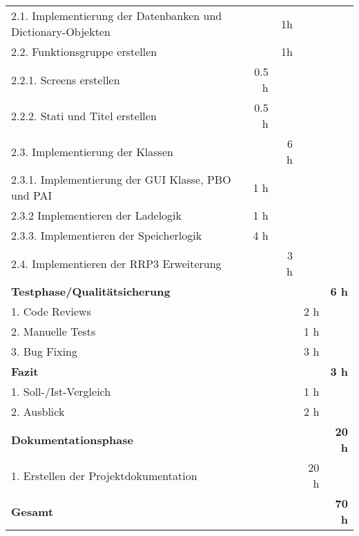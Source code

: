 \begin{tabu}{lrrrr}
2.1. Implementierung der Datenbanken und Dictionary-Objekten & & 1h & & \\
2.2. Funktionsgruppe erstellen & & 1h & & \\
2.2.1. Screens erstellen & 0.5 h & & & \\
2.2.2. Stati und Titel erstellen & 0.5 h & & & \\
2.3. Implementierung der Klassen & & 6 h & & \\
2.3.1. Implementierung der GUI Klasse, PBO und PAI & 1 h & & & \\
2.3.2 Implementieren der Ladelogik & 1 h & & & \\
2.3.3. Implementieren der Speicherlogik & 4 h & & & \\
2.4. Implementieren der RRP3 Erweiterung & & 3 h & & \\
\rowfont{\color{headingfont}}\textbf{Testphase/Qualitätsicherung} & \textbf{} & \textbf{} & \textbf{} & \textbf{6 h} \\
1. Code Reviews & & & 2 h   &  \\
2. Manuelle Tests & & & 1 h & \\
3. Bug Fixing & & & 3 h & \\
\rowfont{\color{headingfont}}\textbf{Fazit} & \textbf{} & \textbf{} & \textbf{} & \textbf{3 h} \\
1. Soll-/Ist-Vergleich & & & 1 h   &  \\
2. Ausblick & & & 2 h & \\
\rowfont{\color{headingfont}}\textbf{Dokumentationsphase} & \textbf{} & \textbf{} & \textbf{} & \textbf{20 h} \\1. Erstellen der Projektdokumentation & & & 20 h & \\
\hline
\hline
\textbf{Gesamt} & \textbf{} & \textbf{} & \textbf{} & \textbf{70 h} \\
\end{tabu}
